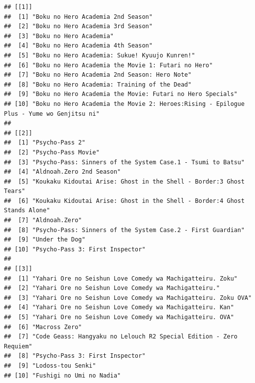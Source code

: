 \documentclass[
]{article}
\begin{document}
\begin{verbatim}
## [[1]]
##  [1] "Boku no Hero Academia 2nd Season"                                                      
##  [2] "Boku no Hero Academia 3rd Season"                                                      
##  [3] "Boku no Hero Academia"                                                                 
##  [4] "Boku no Hero Academia 4th Season"                                                      
##  [5] "Boku no Hero Academia: Sukue! Kyuujo Kunren!"                                          
##  [6] "Boku no Hero Academia the Movie 1: Futari no Hero"                                     
##  [7] "Boku no Hero Academia 2nd Season: Hero Note"                                           
##  [8] "Boku no Hero Academia: Training of the Dead"                                           
##  [9] "Boku no Hero Academia the Movie: Futari no Hero Specials"                              
## [10] "Boku no Hero Academia the Movie 2: Heroes:Rising - Epilogue Plus - Yume wo Genjitsu ni"
## 
## [[2]]
##  [1] "Psycho-Pass 2"                                                           
##  [2] "Psycho-Pass Movie"                                                       
##  [3] "Psycho-Pass: Sinners of the System Case.1 - Tsumi to Batsu"              
##  [4] "Aldnoah.Zero 2nd Season"                                                 
##  [5] "Koukaku Kidoutai Arise: Ghost in the Shell - Border:3 Ghost Tears"       
##  [6] "Koukaku Kidoutai Arise: Ghost in the Shell - Border:4 Ghost Stands Alone"
##  [7] "Aldnoah.Zero"                                                            
##  [8] "Psycho-Pass: Sinners of the System Case.2 - First Guardian"              
##  [9] "Under the Dog"                                                           
## [10] "Psycho-Pass 3: First Inspector"                                          
## 
## [[3]]
##  [1] "Yahari Ore no Seishun Love Comedy wa Machigatteiru. Zoku"         
##  [2] "Yahari Ore no Seishun Love Comedy wa Machigatteiru."              
##  [3] "Yahari Ore no Seishun Love Comedy wa Machigatteiru. Zoku OVA"     
##  [4] "Yahari Ore no Seishun Love Comedy wa Machigatteiru. Kan"          
##  [5] "Yahari Ore no Seishun Love Comedy wa Machigatteiru. OVA"          
##  [6] "Macross Zero"                                                     
##  [7] "Code Geass: Hangyaku no Lelouch R2 Special Edition - Zero Requiem"
##  [8] "Psycho-Pass 3: First Inspector"                                   
##  [9] "Lodoss-tou Senki"                                                 
## [10] "Fushigi no Umi no Nadia"                                          

\end{verbatim}
\end{document}
